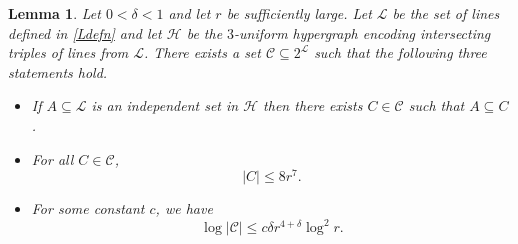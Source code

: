 \documentclass[11pt]{amsart}
\newcommand{\cL}{\mathcal{L}}
\newcommand{\cH}{\mathcal{H}}
\newcommand{\cC}{\mathcal{C}}
\newtheorem{lemma}{Lemma}
\theoremstyle{remark}
\begin{document}
\begin{lemma} \label{lem:cont2}
   Let $0 < \delta < 1$ and let $r$ be sufficiently large. Let $\cL$ be the set of lines defined in \eqref{Ldefn} and let $\cH$ be the $3$-uniform hypergraph encoding intersecting triples of lines from $\cL$. There exists a set $\cC \subseteq 2^{\cL}$ such that the following three statements hold.
   \begin{itemize}
        \item If $A \subseteq \mathcal L$ is an independent set in $\cH$ then there exists $C \in \mathcal C$ such that $A \subseteq C$.
        \item For all $C \in \mathcal C$,
        \[
        |C| \leq 8r^7.
        \]
        \item For some constant $c$, we have 
        \[
        \log | \cC| \leq c\delta r^{4+\delta} \log^2 r .
        \]
    \end{itemize}
\end{lemma}
\end{document}
